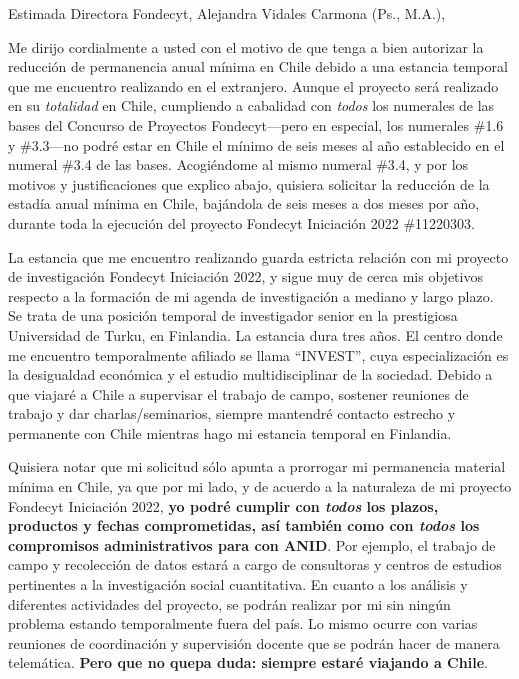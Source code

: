 \documentclass[9pt,stdletter,dateno,sigleft,openany]{newlfm} %
\begin{document}
\begin{newlfm}




\vspace{-2cm}
Estimada Directora Fondecyt, Alejandra Vidales Carmona (Ps., M.A.),

Me dirijo cordialmente a usted con el motivo de que tenga a bien autorizar la reducci\'on de permanencia anual m\'inima en Chile debido a una estancia temporal que me encuentro realizando en el extranjero. Aunque el proyecto ser\'a realizado en su \emph{totalidad} en Chile, cumpliendo a cabalidad con \emph{todos} los numerales de las bases del Concurso de Proyectos Fondecyt---pero en especial, los numerales \#1.6 y \#3.3---no podr\'e estar en Chile el m\'inimo de seis meses al a\~no establecido en el numeral \#3.4 de las bases. Acogi\'endome al mismo numeral \#3.4, y por los motivos y justificaciones que explico abajo, quisiera solicitar la reducci\'on de la estad\'ia anual m\'inima en Chile, baj\'andola de seis meses a dos meses por a\~no, durante toda la ejecuci\'on del proyecto Fondecyt Iniciaci\'on 2022 \#11220303. 

La estancia que me encuentro realizando guarda estricta relaci\'on con mi proyecto de investigaci\'on Fondecyt Iniciaci\'on 2022, y sigue muy de cerca mis objetivos respecto a la formaci\'on de mi agenda de investigaci\'on a mediano y largo plazo. Se trata de una posici\'on temporal de investigador senior en la prestigiosa Universidad de Turku, en Finlandia. La estancia dura tres a\~nos. El centro donde me encuentro temporalmente afiliado se llama ``INVEST'', cuya especializaci\'on es la desigualdad econ\'omica y el estudio multidisciplinar de la sociedad. Debido a que viajar\'e a Chile a supervisar el trabajo de campo, sostener reuniones de trabajo y dar charlas/seminarios, siempre mantendr\'e contacto estrecho y permanente con Chile mientras hago mi estancia temporal en Finlandia. 

Quisiera notar que mi solicitud s\'olo apunta a prorrogar mi permanencia material m\'inima en Chile, ya que por mi lado, y de acuerdo a la naturaleza de mi proyecto Fondecyt Iniciaci\'on 2022, {\bf yo podr\'e cumplir con \emph{todos} los plazos, productos y fechas comprometidas, as\'i tambi\'en como con \emph{todos} los compromisos administrativos para con ANID}. Por ejemplo, el trabajo de campo y recolecci\'on de datos estar\'a a cargo de consultoras y centros de estudios pertinentes a la investigaci\'on social cuantitativa. En cuanto a los an\'alisis y diferentes actividades del proyecto, se podr\'an realizar por mi sin ning\'un problema estando temporalmente fuera del pa\'is. Lo mismo ocurre con varias reuniones de coordinaci\'on y supervisi\'on docente que se podr\'an hacer de manera telem\'atica. {\bf Pero que no quepa duda: siempre estar\'e viajando a Chile}.


\end{newlfm}
\end{document}
